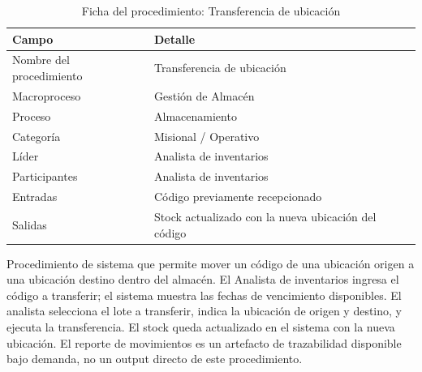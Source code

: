 \documentclass[11pt, a4paper, oneside]{report}
\begin{document}
\begin{table}[H]
\centering\small
\renewcommand{\arraystretch}{1.25}
\setlength{\tabcolsep}{6pt}
\begin{tabularx}{\textwidth}{|>{\raggedright\arraybackslash}p{}|>{\raggedright\arraybackslash}X|}
\hline
\rowcolor{upeu_mid}
\color{white}\bfseries Campo & \color{white}\bfseries Detalle \\ \hline
\rowcolor{gray!10}
Nombre del procedimiento & Transferencia de ubicación \\ \hline
Macroproceso & Gestión de Almacén \\ \hline
\rowcolor{gray!10}
Proceso & Almacenamiento \\ \hline
Categoría & Misional / Operativo \\ \hline
\rowcolor{gray!10}
Líder & Analista de inventarios \\ \hline
Participantes & Analista de inventarios \\ \hline
Entradas & Código previamente recepcionado \\ \hline
\rowcolor{gray!10}
Salidas & Stock actualizado con la nueva ubicación del código \\ \hline
\end{tabularx}
\caption{Ficha del procedimiento: Transferencia de ubicación}
\end{table}

Procedimiento de sistema que permite mover un código de una ubicación origen a una ubicación destino dentro del almacén. El Analista de inventarios ingresa el código a transferir; el sistema muestra las fechas de vencimiento disponibles. El analista selecciona el lote a transferir, indica la ubicación de origen y destino, y ejecuta la transferencia. El stock queda actualizado en el sistema con la nueva ubicación. El reporte de movimientos es un artefacto de trazabilidad disponible bajo demanda, no un output directo de este procedimiento.
\end{document}
